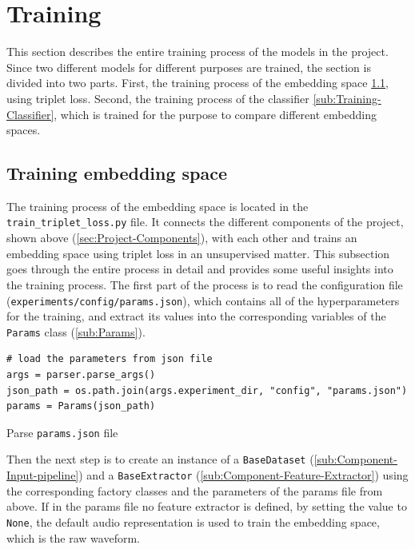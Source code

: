 \section{Training}
\label{sec:Training}
This section describes the entire training process of the models in the project. Since two different models for different purposes are trained, the section is divided into two parts. First, the training process of the embedding space \ref{sub:Training-Embedding-Space}, using triplet loss. Second, the training process of the classifier \ref{sub:Training-Classifier}, which is trained for the purpose to compare different embedding spaces.

\subsection{Training embedding space}
\label{sub:Training-Embedding-Space}
The training process of the embedding space is located in the \texttt{train\_triplet\_loss.py} file. It connects the different components of the project, shown above (\ref{sec:Project-Components}), with each other and trains an embedding space using triplet loss in an unsupervised matter. This subsection goes through the entire process in detail and provides some useful insights into the training process.
\newline
\newline
The first part of the process is to read the configuration file (\texttt{experiments/config/params.json}), which contains all of the hyperparameters for the training, and extract its values into the corresponding variables of the \texttt{Params} class (\ref{sub:Params}).

\begin{code}[htbp]
\begin{verbatim}
# load the parameters from json file
args = parser.parse_args()
json_path = os.path.join(args.experiment_dir, "config", "params.json")
params = Params(json_path)
\end{verbatim}
\caption{Parse \texttt{params.json} file}
\label{code:Parse-Params-File}
\end{code}
\noindent
Then the next step is to create an instance of a \texttt{BaseDataset} (\ref{sub:Component-Input-pipeline}) and a \texttt{BaseExtractor} (\ref{sub:Component-Feature-Extractor}) using the corresponding factory classes and the parameters of the params file from above. If in the params file no feature extractor is defined, by setting the value to \texttt{None}, the default audio representation is used to train the embedding space, which is the raw waveform.

